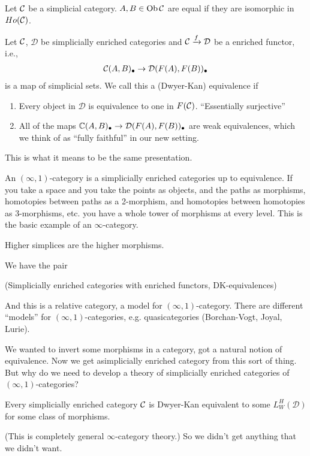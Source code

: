 \documentclass[class=report, crop=false,a4paper,twoside]{standalone}
\begin{document}
\begin{definition}
	Let $\mathcal{C}$ be a simplicial category. $A,B \in \operatorname{Ob}\mathcal{C}$ are equal if they are isomorphic in $Ho(\mathcal{C})$. 
\end{definition}

\begin{definition}
	Let $\mathcal{C}$, $\mathcal{D}$ be simplicially enriched categories and $\mathcal{C} \xrightarrow{f} \mathcal{D}$ be a enriched functor, i.e., 
	\begin{align*}
		\mathcal{C}(A,B)_\bullet \to \mathcal{D}(F(A),F(B))_\bullet
	\end{align*}
	is a map of simplicial sets. We call this a (Dwyer-Kan) equivalence if 
	\begin{enumerate}
		\item Every object in $\mathcal{D}$ is equivalence to one in $F(\mathcal{C})$. ``Essentially surjective''
		\item All of the maps $\mathbb{C}(A,B)_\bullet \to \mathcal{D}(F(A),F(B))_\bullet$ are weak equivalences, which we think of as ``fully faithful'' in our new setting. 
	\end{enumerate}
\end{definition}
This is what it means to be the same presentation. 

An $(\infty,1)$-category is a simplicially enriched categories up to equivalence. If you take a space and you take the points as objects, and the paths as morphisms, homotopies between paths as a 2-morphism, and homotopies between homotopies as 3-morphisms, etc. you have a whole tower of morphisms at every level. This is the basic example of an $\infty$-category. 

Higher simplices are the higher morphisms.

We have the pair

(Simplicially enriched categories with enriched functors, DK-equivalences)

And this is a relative category, a model for $(\infty,1)$-category. There are different ``models'' for $(\infty,1)$-categories, e.g. quasicategories (Borchan-Vogt, Joyal, Lurie). 

We wanted to invert some morphisms in a category, got a natural notion of equivalence. Now we get asimplicially enriched category from this sort of thing. But why do we need to develop a theory of simplicially enriched categories of $(\infty,1)$-categories?
\begin{theorem}
	Every simplicially enriched category $\mathcal{C}$ is Dwyer-Kan equivalent to some $L_W^H(\mathcal{D})$ for some class of morphisms. 
\end{theorem}
(This is completely general $\infty$-category theory.) So we didn't get anything that we didn't want.
\end{document}

